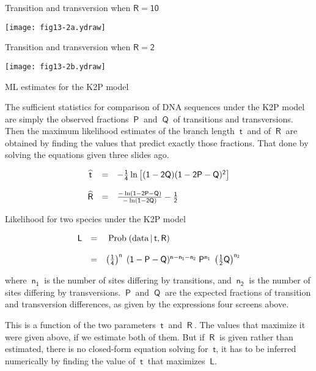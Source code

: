 \documentclass[bluish,slideColor,colorBG,pdf]{prosper}
\def\prob{{\rm \;Prob\;}}
\begin{document}
\begin{slide}[Replace]{Transition and transversion when $\mathsf{R = 10}$ }
\hspace{0.2in}

\centerline{\texttt{[image: fig13-2a.ydraw]}}

\end{slide}

\begin{slide}[Replace]{Transition and transversion when $\mathsf{R = 2}$ }

\centerline{\texttt{[image: fig13-2b.ydraw]}}

\end{slide}

\begin{slide}[Replace]{ML estimates for the K2P model}
\bigskip

The sufficient statistics for comparison of DNA sequences under the K2P model
are simply the observed fractions $\ \mathsf{P}\ $ and $\ \mathsf{Q}\ $ of
transitions and transversions.  Then the maximum likelihood estimates of the
branch length $\ \mathsf{t}\ $ and of $\ \mathsf{R}\ $ are obtained by finding
the values that predict exactly those fractions.  That done by solving the
equations given three slides ago.

{
\[
\begin{array}{c c l}
\mathsf{\widehat{t}} & \mathsf{=} & \mathsf{-\frac{1}{4} \ln \left[(1-2Q)(1-2P-Q)^2 \right]}\\ 
  & & \\
\mathsf{\widehat{R}} & \mathsf{=} & \mathsf{\frac{- \ln (1-2P-Q)}{- \ln (1-2Q)} - \frac{1}{2}}
\end{array} 
\]
}

\end{slide}

\begin{slide}[Replace]{Likelihood for two species under the K2P model}
\bigskip

\noindent
{
\[
\begin{array}{c c l}
\mathsf{L} & \mathsf{=} & \mathsf{\prob({\rm data}\, |\, t, R)}\\
& & \\
& \mathsf{=} & \mathsf{\left(\frac{1}{4}\right)^n\;(1-P-Q)^{n-n_1-n_2}\;P^{n_1}\;\left(\frac{1}{2} Q\right)^{n_2}} 
\end{array}
\]
}

\noindent
where $\mathsf{~n_1~}$ is the number of sites differing by transitions, and
$~\mathsf{n_2}~$ is the number of sites differing by transversions.  $~\mathsf{P}~$ and $~\mathsf{Q}~$ are the expected fractions of transition and 
transversion differences, as given by the expressions four screens above.
\bigskip

This is a function of the two parameters $\ \mathsf{t}\ $ and $\ \mathsf{R}\ $.
The values that maximize it were given above, if we estimate both of them.  But
if $\ \mathsf{R}\ $ is given rather than estimated, there is no closed-form
equation solving for $\ \mathsf{t}$, it has to be inferred numerically by
finding the value of $\ \mathsf{t}\ $ that maximizes $\ \mathsf{L}$.

\end{slide}
\end{document}
